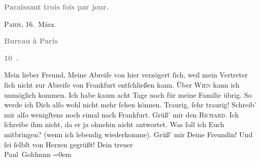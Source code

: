 \begin{ledgroupsized}[t]{13cm}
           \pstart
           \begin{otherlanguage}{french}\textcolor{gray}{\textbf{\textbf{Paraissant trois fois par jour.}}}\end{otherlanguage}\hfill \textsc{Paris}, 16. März.\pend
           \pstart
           \begin{otherlanguage}{french}\textcolor{gray}{\textbf{\textbf{Bureau à Paris}}}\end{otherlanguage}\pend
           \pstart
           \begin{otherlanguage}{french}\textcolor{gray}{\textbf{\textbf{10 .}}}\end{otherlanguage}\pend
           \pstart\center{}Mein lieber Freund,\pend\pstart
           Meine Abreiſe von hier
               verzögert ſich, weil mein Vertreter ſich nicht zur Abreiſe von Frankfurt entſchließen kann.\pend
           \pstart
           Über \textsc{Wien} kann ich unmöglich kommen. Ich habe kaum acht Tage noch für meine Familie
               übrig.\pend
           \pstart
           So werde ich Dich alſo wohl nicht mehr ſehen können. Traurig, ſehr traurig!\pend
           \pstart
           {\pb}Schreib’ mir alſo wenigſtens noch eimal nach Frankfurt. Grüß’ mir den \textsc{Richard}. Ich ſchreibe ihm nicht, da er ja ohnehin nicht antwortet. Was ſoll ich Euch
               mitbringen? (wenn ich lebendig wiederkomme).\pend
           \pstart
           Grüß’ mir Deine Freundin!\pend
           \pstart
           Und ſei ſelbſt von Herzen gegrüßt!\pend
           \pstart
           Dein treuer {\\[\baselineskip]}\spacefill\mbox{Paul Goldmnn}\pend
           \leftskip=0em{}
         
         \endnumbering{}\end{ledgroupsized}  \newcommand{\dateiname}{L02843}\newcommand{\titel}{Paul Goldmann an Arthur Schnitzler, 16. 3. [1898]}\newcommand{\editorInnen}{Martin Anton Müller und Laura Untner}
      